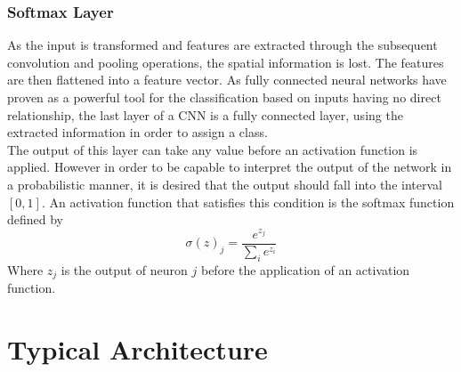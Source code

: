 \subsubsection{Softmax Layer}

As the input is transformed and features are extracted through the subsequent convolution and pooling operations, the spatial information is lost. The features are then flattened into a feature vector. As fully connected neural networks have proven as a powerful tool for the classification based on inputs having no direct relationship, the last layer of a CNN is a fully connected layer, using the extracted information in order to assign a class. \\

The output of this layer can take any value before an activation function is applied. However in order to be capable to interpret the output of the network in a probabilistic manner, it is desired that the output should fall into the interval $[0,1]$. An activation function that satisfies this condition is the softmax function defined by
\begin{equation}
\sigma(z)_j = \frac{e^{z_j}}{\sum_i e^{z_i}}
\end{equation}
Where $z_j$ is the output of neuron $j$ before the application of an activation function. 



\section{Typical Architecture}


